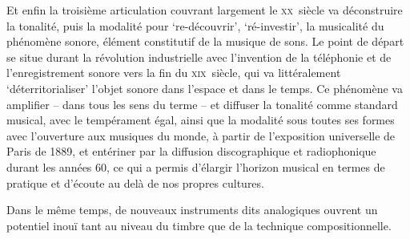 \documentclass{article}
\begin{document}
Et enfin la troisième articulation couvrant largement le \textsc{xx}\ieme ~siècle va déconstruire %
la tonalité, puis la modalité pour `re-découvrir', `ré-investir', la musicalité du phénomène sonore, élément constitutif de la musique de sons. Le point de départ se situe durant la révolution industrielle avec l'invention de la téléphonie et de l'enregistrement sonore vers la fin du \textsc{xix}\ieme ~siècle, qui va littéralement `déterritorialiser' %
 l'objet sonore dans l'espace et dans le temps. Ce phénomène va amplifier -- dans tous les sens du terme -- et %
 diffuser la tonalité comme standard musical, avec le tempérament égal, ainsi que la modalité sous toutes ses formes avec l’ouverture aux musiques du monde, %
 à partir de l’exposition universelle de Paris de 1889, et entériner par la diffusion discographique et radiophonique durant les années 60, ce qui a permis d’élargir l’horizon musical en termes de pratique et d’écoute au delà de nos propres cultures.%

Dans le même temps, de nouveaux instruments dits analogiques ouvrent un potentiel inouï tant au niveau du timbre que de la technique compositionnelle.
\end{document}
